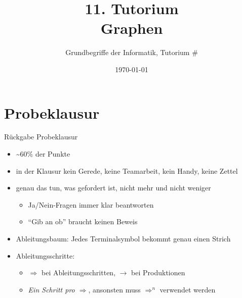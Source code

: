 




\title[Graphen]{11. Tutorium\\ Graphen}
\subtitle{Grundbegriffe der Informatik, Tutorium \#\mytutnumber}
\date{\today}

\usetikzlibrary{matrix}
\usetikzlibrary{arrows.meta}
\usetikzlibrary{automata}
\usetikzlibrary{tikzmark}


\titleframe
\roadmap


\section{Probeklausur}
\begin{frame}{Rückgabe Probeklausur}
	\begin{itemize}
		\item \textasciitilde 60\% der Punkte
		\item in der Klausur \textcolor{kit-red100}{kein Gerede, keine Teamarbeit, kein Handy, keine Zettel}
		\item genau das tun, was gefordert ist, nicht mehr und nicht weniger
		\begin{itemize}
			\item Ja/Nein-Fragen immer klar beantworten
			\item \enquote{Gib an ob} braucht keinen Beweis
		\end{itemize}
		\item Ableitungsbaum: Jedes Terminalsymbol bekommt genau einen Strich
		\item Ableitungsschritte:
		\begin{itemize}
			\item $\Rightarrow$ bei Ableitungsschritten, $\rightarrow$ bei Produktionen
			\item \emph{Ein Schritt pro $\Rightarrow$}, ansonsten muss $\Rightarrow^n$ verwendet werden
		\end{itemize}
	\end{itemize}
	
\end{frame}




